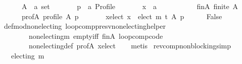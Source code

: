 \begin{isabellebody}
\isanewline
\ \ \ \ \ \ A\ {\isacharcolon}{\kern0pt}{\isacharcolon}{\kern0pt}\ {\isachardoublequoteopen}{\isacharprime}{\kern0pt}a\ set{\isachardoublequoteclose}\ \isanewline
\ \ \ \ \ \ p\ {\isacharcolon}{\kern0pt}{\isacharcolon}{\kern0pt}\ {\isachardoublequoteopen}{\isacharprime}{\kern0pt}a\ Profile{\isachardoublequoteclose}\ \isanewline
\ \ \ \ \ \ x\ {\isacharcolon}{\kern0pt}{\isacharcolon}{\kern0pt}\ {\isachardoublequoteopen}{\isacharprime}{\kern0pt}a{\isachardoublequoteclose}\isanewline
\ \ \ \ \isamarkupfalse%
\isanewline
\ \ \ \ \ \ fin{\isacharunderscore}{\kern0pt}A{\isacharcolon}{\kern0pt}\ {\isachardoublequoteopen}finite\ A{\isachardoublequoteclose}\ \isanewline
\ \ \ \ \ \ prof{\isacharunderscore}{\kern0pt}A{\isacharcolon}{\kern0pt}\ {\isachardoublequoteopen}profile\ A\ p{\isachardoublequoteclose}\ \isanewline
\ \ \ \ \ \ x{\isacharunderscore}{\kern0pt}elect{\isacharcolon}{\kern0pt}\ {\isachardoublequoteopen}x\ {\isasymin}\ elect\ {\isacharparenleft}{\kern0pt}m\ {\isasymcirclearrowleft}\isactrlsub t{\isacharparenright}{\kern0pt}\ A\ p{\isachardoublequoteclose}\isanewline
\ \ \ \ \isamarkupfalse%
\ {\isachardoublequoteopen}False{\isachardoublequoteclose}\isanewline
\ \ \isamarkupfalse%
\ def{\isacharunderscore}{\kern0pt}mod{\isacharunderscore}{\kern0pt}non{\isacharunderscore}{\kern0pt}electing\ loop{\isacharunderscore}{\kern0pt}comp{\isacharunderscore}{\kern0pt}presv{\isacharunderscore}{\kern0pt}non{\isacharunderscore}{\kern0pt}electing{\isacharunderscore}{\kern0pt}helper\isanewline
\ \ \ \ \ \ \ \ non{\isacharunderscore}{\kern0pt}electing{\isacharunderscore}{\kern0pt}m\ empty{\isacharunderscore}{\kern0pt}iff\ fin{\isacharunderscore}{\kern0pt}A\ loop{\isacharunderscore}{\kern0pt}comp{\isacharunderscore}{\kern0pt}code\isanewline
\ \ \ \ \ \ \ \ non{\isacharunderscore}{\kern0pt}electing{\isacharunderscore}{\kern0pt}def\ prof{\isacharunderscore}{\kern0pt}A\ x{\isacharunderscore}{\kern0pt}elect\isanewline
\ \ \isamarkupfalse%
\ metis\isanewline
{}\isamarkupfalse%
%
\endisatagproof
{\isafoldproof}%
%
\isadelimproof
\isanewline
%
\endisadelimproof
\isanewline
\isanewline
{}\isamarkupfalse%
\ rev{\isacharunderscore}{\kern0pt}comp{\isacharunderscore}{\kern0pt}non{\isacharunderscore}{\kern0pt}blocking{\isacharbrackleft}{\kern0pt}simp{\isacharbrackright}{\kern0pt}{\isacharcolon}{\kern0pt}\isanewline
\ \ \ {\isachardoublequoteopen}electing\ m{\isachardoublequoteclose}\isanewline

\end{isabellebody}
